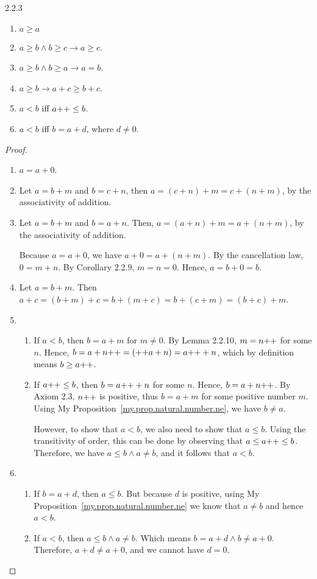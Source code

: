 \begin{exercise}{2.2.3}
\begin{enumerate}
	\item $a \ge a$
	\item $a \ge b \wedge b \ge c \to a \ge c$.
	\item $a \ge b \wedge b \ge a \to a = b$.
	\item $a \ge b \to a+c \ge b+c$.
	\item $a < b$ iff $a{+}{+} \le b$.
	\item $a < b$ iff $b = a+d$, where $d \ne 0$.
\end{enumerate}
\end{exercise}
\begin{proof}\leavevmode
\begin{enumerate}
	\item $a=a+0$.
	\item Let $a = b+m$ and $b = c+n$, then $a = (c+n)+m = c +(n+m)$, by the associativity of addition.
	\item Let $a=b+m$ and $b=a+n$. Then, $a=(a+n)+m = a+(n+m)$, by the associativity of addition.
	
	Because $a=a+0$, we have $a+0 = a+(n+m)$. By the cancellation law, $0 = m+n$. By Corollary 2.2.9, $m=n=0$. Hence, $a=b+0=b$.
	\item Let $a = b+m$. Then $a+c=(b+m)+c = b+(m+c) = b+(c+m) = (b+c)+m$.
	\item 
	\begin{enumerate}
		\item If $a < b$, then $b=a+m$ for $m \ne 0$. By Lemma 2.2.10, $m = n{+}{+}$ for some $n$. Hence, $b=a+n{+}{+} = ({+}{+}a+n) = a{+}{+}+n$, which by definition means $b \ge a{+}{+}$.
		
		\item
		If $a{+}{+} \le b$, then $b=a{+}{+}+n$ for some $n$. Hence, $b=a+n{+}{+}$. By Axiom 2.3, $n{+}{+}$ is positive, thus $b=a+m$ for some positive number $m$. Using My Proposition~\ref{my.prop.natural.number.ne}, we have $b \ne a$. 
		
		However, to show that $a < b$, we also need to show that $a \le b$. Using the transitivity of order, this can be done by observing that $a \le a{+}{+} \le b$. Therefore, we have $a \le b \wedge a \ne b$, and it follows that $a < b$.
	\end{enumerate}

	\item 
	\begin{enumerate}
		\item If $b=a+d$, then $a \le b$. But because $d$ is positive, using My Proposition~\ref{my.prop.natural.number.ne} we know that $a \ne b$ and hence $a < b$.
		
		\item If $a<b$, then $a \le b \wedge a \ne b$. Which means $b=a+d \wedge b \ne a+0$. Therefore, $a+d \ne a+0$, and we cannot have $d=0$.
	\end{enumerate}
\end{enumerate}
\end{proof}

